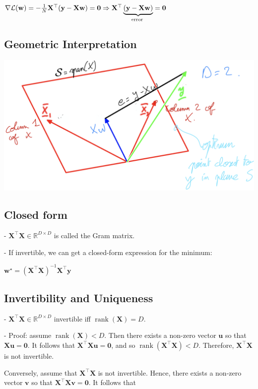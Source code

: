 $
\nabla \mathcal{L}(\mathbf{w})=-\frac{1}{N} \mathbf{X}^{\top}(\mathbf{y}-\mathbf{X} \mathbf{w}) = \mathbf{0}\\
\Rightarrow\mathbf{X}^{\top} \underbrace{(\mathbf{y}-\mathbf{X} \mathbf{w})}_{\text {error }}=\mathbf{0}
$

\subsection*{Geometric Interpretation}

    \includegraphics*[width=0.7\columnwidth]{figures/geom_ls.png}


\subsection*{Closed form}
- $\mathbf{X}^{\top} \mathbf{X} \in \mathbb{R}^{D \times D}$ is called the Gram matrix. 

- If invertible, we can get a closed-form expression for the minimum:

$
\mathbf{w}^{\star}=\left(\mathbf{X}^{\top} \mathbf{X}\right)^{-1} \mathbf{X}^{\top} \mathbf{y}
$

\subsection*{Invertibility and Uniqueness}
- $\mathbf{X}^{\top} \mathbf{X} \in \mathbb{R}^{D \times D}$ invertible iff $\operatorname{rank}(\mathbf{X})=D$.

- Proof: assume $\operatorname{rank}(\mathbf{X})<D$. Then there exists a non-zero vector $\mathbf{u}$ so that $\mathbf{X u}=\mathbf{0}$. It follows that $\mathbf{X}^{\top} \mathbf{X u}=\mathbf{0}$, and so $\operatorname{rank}\left(\mathbf{X}^{\top} \mathbf{X}\right)<D$. Therefore, $\mathbf{X}^{\top} \mathbf{X}$ is not invertible.

Conversely, assume that $\mathbf{X}^{\top} \mathbf{X}$ is not invertible. Hence, there exists a non-zero vector $\mathbf{v}$ so that $\mathbf{X}^{\top} \mathbf{X v}=\mathbf{0}$. It follows that

